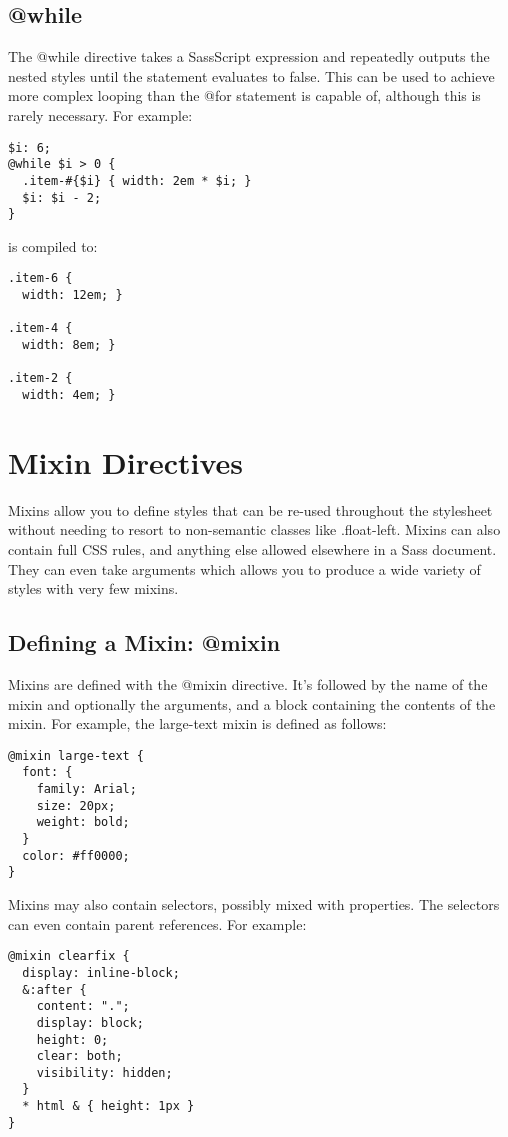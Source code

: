 \documentclass[9pt]{article}
\begin{document}
\subsection{@while}


 The @while directive takes a SassScript expression and repeatedly outputs the nested styles until the statement evaluates to false. This can be used to achieve more complex looping than the @for statement is capable of, although this is rarely necessary. For example:
\begin{verbatim}
$i: 6;
@while $i > 0 {
  .item-#{$i} { width: 2em * $i; }
  $i: $i - 2;
}
\end{verbatim}


 is compiled to:
\begin{verbatim}
.item-6 {
  width: 12em; }

.item-4 {
  width: 8em; }

.item-2 {
  width: 4em; }
\end{verbatim}
\section{Mixin Directives}


 Mixins allow you to define styles that can be re-used throughout the stylesheet without needing to resort to non-semantic classes like .float-left. Mixins can also contain full CSS rules, and anything else allowed elsewhere in a Sass document. They can even take arguments which allows you to produce a wide variety of styles with very few mixins.
\subsection{Defining a Mixin: @mixin}


 Mixins are defined with the @mixin directive. It’s followed by the name of the mixin and optionally the arguments, and a block containing the contents of the mixin. For example, the large-text mixin is defined as follows:
\begin{verbatim}
@mixin large-text {
  font: {
    family: Arial;
    size: 20px;
    weight: bold;
  }
  color: #ff0000;
}
\end{verbatim}


 Mixins may also contain selectors, possibly mixed with properties. The selectors can even contain parent references. For example:
\begin{verbatim}
@mixin clearfix {
  display: inline-block;
  &:after {
    content: ".";
    display: block;
    height: 0;
    clear: both;
    visibility: hidden;
  }
  * html & { height: 1px }
}
\end{verbatim}
\end{document}
